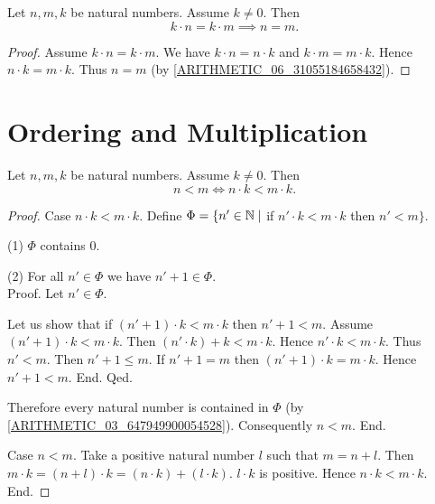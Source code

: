 \documentclass[10pt]{article}
\begin{document}
  \begin{forthel}
    \begin{corollary}
      Let $n, m, k$ be natural numbers.
      Assume $k \neq 0$.
      Then \[ k \cdot n = k \cdot m \implies n = m. \]
    \end{corollary}
    \begin{proof}
      Assume $k \cdot n = k \cdot m$.
      We have $k \cdot n = n \cdot k$ and $k \cdot m = m \cdot k$.
      Hence $n \cdot k = m \cdot k$.
      Thus $n = m$ (by \cref{ARITHMETIC_06_31055184658432}).
    \end{proof}
  \end{forthel}


  \section{Ordering and Multiplication}

  \begin{forthel}
    \begin{proposition}
      Let $n, m, k$ be natural numbers.
      Assume $k \neq 0$.
      Then \[ n < m \iff n \cdot k < m \cdot k. \]
    \end{proposition}
    \begin{proof}
      Case $n \cdot k < m \cdot k$.
        Define $\Phi = \{ n' \in \mathbb{N} \mid$ if $n' \cdot k < m \cdot k$ then
        $n' < m \}$.

        (1) $\Phi$ contains $0$.

        (2) For all $n' \in \Phi$ we have $n' + 1 \in \Phi$. \\
        Proof.
          Let $n' \in \Phi$.

          Let us show that if $(n' + 1) \cdot k < m \cdot k$ then $n' + 1 < m$.
            Assume $(n' + 1) \cdot k < m \cdot k$.
            Then $(n' \cdot k) + k < m \cdot k$.
            Hence $n' \cdot k < m \cdot k$.
            Thus $n' < m$.
            Then $n' + 1 \leq m$.
            If $n' + 1 = m$ then $(n' + 1) \cdot k = m \cdot k$.
            Hence $n' + 1 < m$.
          End.
        Qed.

        Therefore every natural number is contained in $\Phi$ (by \cref{ARITHMETIC_03_647949900054528}).
        Consequently $n < m$.
      End.

      Case $n < m$.
        Take a positive natural number $l$ such that $m = n + l$.
        Then $m \cdot k = (n + l) \cdot k = (n \cdot k) + (l \cdot k)$.
        $l \cdot k$ is positive.
        Hence $n \cdot k < m \cdot k$.
      End.
    \end{proof}
  \end{forthel}
\end{document}

